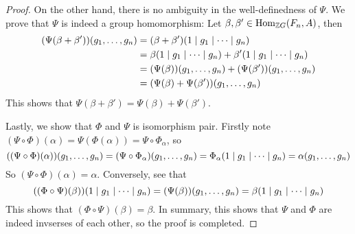 \begin{proof}
    On the other hand, there is no ambiguity in the well-definedness of $\Psi$. We prove that $\Psi$ is indeed a group homomorphism: Let $\beta, \beta' \in \operatorname{Hom}_{{\mathbb Z} G}(F_n,A)$, then
    \begin{align*}
        (\Psi(\beta+\beta'))(g_1 ,\dots, g_n) &= (\beta+\beta')(1\mid g_1 \mid \dots \mid g_n) \\
        &= \beta(1\mid g_1 \mid \dots \mid g_n) + \beta'(1\mid g_1 \mid \dots \mid g_n) \\
        &= (\Psi(\beta))(g_1 ,\dots, g_n) + (\Psi(\beta'))(g_1 ,\dots, g_n)\\
        &= (\Psi(\beta) + \Psi(\beta'))(g_1 ,\dots, g_n)
    \end{align*}
    This shows that $\Psi(\beta + \beta') = \Psi(\beta) + \Psi(\beta')$.

    Lastly, we show that $\Phi$ and $\Psi$ is isomorphism pair. Firstly note $(\Psi \circ \Phi)(\alpha) = \Psi (\Phi(\alpha)) = \Psi \circ \Phi_\alpha$, so
    \[((\Psi \circ \Phi)(\alpha))(g_1 ,\dots, g_n) = (\Psi \circ \Phi_\alpha)(g_1 ,\dots, g_n) = \Phi_\alpha(1\mid g_1 \mid \dots \mid g_n) = \alpha(g_1 ,\dots, g_n)\]
    So $(\Psi \circ \Phi)(\alpha) = \alpha$. Conversely, see that 
    \[((\Phi \circ \Psi)(\beta))(1\mid g_1 \mid \dots \mid g_n) = (\Psi(\beta))(g_1 ,\dots, g_n) = \beta(1\mid g_1 \mid \dots \mid g_n)\]
    This shows that $(\Phi \circ \Psi)(\beta) = \beta$. In summary, this shows that $\Psi$ and $\Phi$ are indeed invserses of each other, so the proof is completed.
\end{proof}

